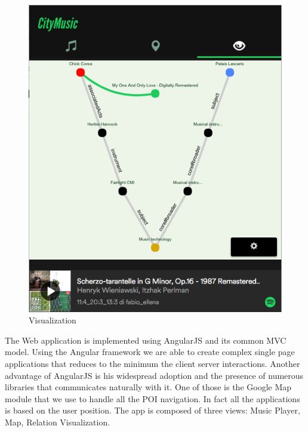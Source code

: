 \documentclass[paper=a4, fontsize=11pt]{scrartcl}
\begin{document}
\begin{figure}[!htb]
\begin{minipage}[t]{0.45\textwidth}
\includegraphics[width=\linewidth]{images/Visualization_2.png}
\caption{Visualization}
\label{fig:visualization}
\end{minipage}

\end{figure}
The Web application is implemented using AngularJS and its common MVC model. Using the Angular framework we are able to create complex single page applications that reduces to the minimum the client server interactions. Another advantage of AngularJS is his widespread adoption and the presence of numerous libraries that communicates naturally with it. One of those is the Google Map module that we use to handle all the POI navigation. In fact all the applications is based on the user position. 
The app is composed of three views: Music Player, Map, Relation Visualization.
\end{document}
